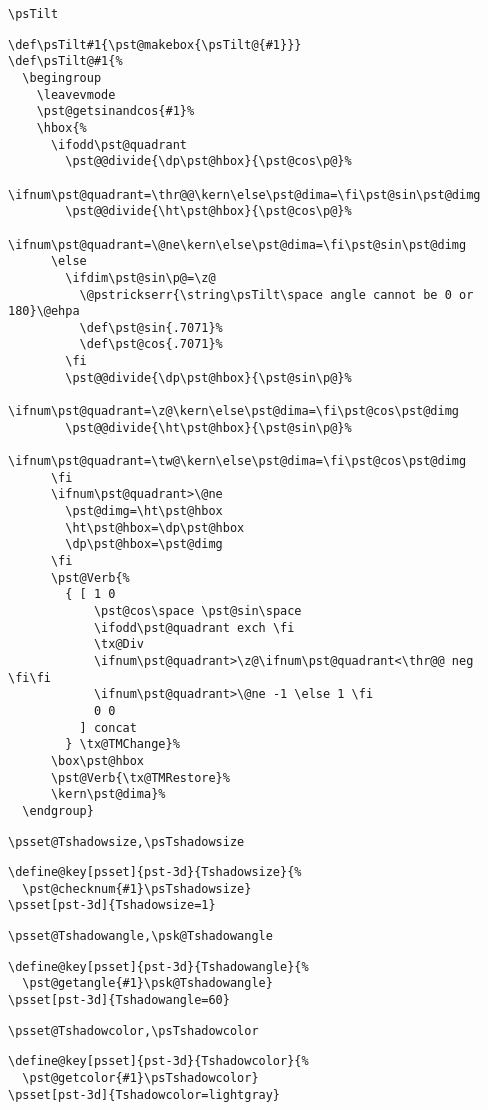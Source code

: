 \documentclass[11pt,english,BCOR10mm,DIV12,bibliography=totoc,parskip=false,smallheadings
    headexclude,footexclude,oneside,dvipsnames,svgnames]{pst-doc}
\begin{document}
 {\verb+\psTilt+}
    \begin{lstlisting}
\def\psTilt#1{\pst@makebox{\psTilt@{#1}}}
\def\psTilt@#1{%
  \begingroup
    \leavevmode
    \pst@getsinandcos{#1}%
    \hbox{%
      \ifodd\pst@quadrant
        \pst@@divide{\dp\pst@hbox}{\pst@cos\p@}%
        \ifnum\pst@quadrant=\thr@@\kern\else\pst@dima=\fi\pst@sin\pst@dimg
        \pst@@divide{\ht\pst@hbox}{\pst@cos\p@}%
        \ifnum\pst@quadrant=\@ne\kern\else\pst@dima=\fi\pst@sin\pst@dimg
      \else
        \ifdim\pst@sin\p@=\z@
          \@pstrickserr{\string\psTilt\space angle cannot be 0 or 180}\@ehpa
          \def\pst@sin{.7071}%
          \def\pst@cos{.7071}%
        \fi
        \pst@@divide{\dp\pst@hbox}{\pst@sin\p@}%
        \ifnum\pst@quadrant=\z@\kern\else\pst@dima=\fi\pst@cos\pst@dimg
        \pst@@divide{\ht\pst@hbox}{\pst@sin\p@}%
        \ifnum\pst@quadrant=\tw@\kern\else\pst@dima=\fi\pst@cos\pst@dimg
      \fi
      \ifnum\pst@quadrant>\@ne
        \pst@dimg=\ht\pst@hbox
        \ht\pst@hbox=\dp\pst@hbox
        \dp\pst@hbox=\pst@dimg
      \fi
      \pst@Verb{%
        { [ 1 0
            \pst@cos\space \pst@sin\space
            \ifodd\pst@quadrant exch \fi
            \tx@Div
            \ifnum\pst@quadrant>\z@\ifnum\pst@quadrant<\thr@@ neg \fi\fi
            \ifnum\pst@quadrant>\@ne -1 \else 1 \fi
            0 0
          ] concat
        } \tx@TMChange}%
      \box\pst@hbox
      \pst@Verb{\tx@TMRestore}%
      \kern\pst@dima}%
  \endgroup}
    \end{lstlisting}


 {\verb+\psset@Tshadowsize,\psTshadowsize+}
\begin{lstlisting}
\define@key[psset]{pst-3d}{Tshadowsize}{%
  \pst@checknum{#1}\psTshadowsize}
\psset[pst-3d]{Tshadowsize=1}
\end{lstlisting}


{\verb+\psset@Tshadowangle,\psk@Tshadowangle+}
\begin{lstlisting}
\define@key[psset]{pst-3d}{Tshadowangle}{%
  \pst@getangle{#1}\psk@Tshadowangle}
\psset[pst-3d]{Tshadowangle=60}
\end{lstlisting}


 {\verb+\psset@Tshadowcolor,\psTshadowcolor+}
\begin{lstlisting}
\define@key[psset]{pst-3d}{Tshadowcolor}{%
  \pst@getcolor{#1}\psTshadowcolor}
\psset[pst-3d]{Tshadowcolor=lightgray}
\end{lstlisting}
\end{document}

